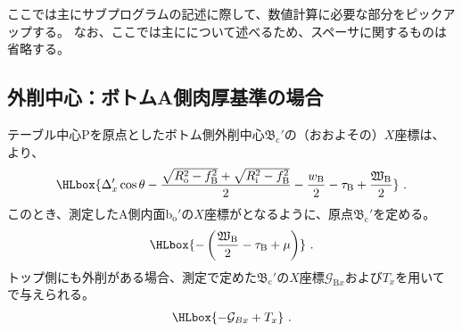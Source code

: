 

ここでは主にサブプログラムの記述に際して、数値計算に必要な部分をピックアップする。
なお、ここでは主に\DMC について述べるため、スペーサに関するものは省略する。





\subsection{外削中心：ボトムA側肉厚基準の場合}
テーブル中心Pを原点としたボトム側外削中心$\mathfrak B_\mathrm c'$の（おおよその）$X$座標は、より、
\begin{align*}
  \HLbox{%
    \Delta_x'\cos\theta
    -\frac{\sqrt{R_\mathrm o^2-f_\mathrm B^2}+\sqrt{R_\mathrm i^2-f_\mathrm B^2}}2
    -\frac{w_\mathrm B}2
    -\tau_\mathrm B
    +\frac{\mathfrak W_\mathrm B}2
  }\ .
\end{align*}
このとき、測定したA側内面b$_\mathrm o'$の$X$座標がとなるように、原点$\mathfrak B_\mathrm c'$を定める。
\begin{align*}
  \HLbox{-\left(\frac{\mathfrak W_\mathrm B}2-\tau_\mathrm B+\mu\right)}\ .
\end{align*}
トップ側にも外削がある場合、測定で定めた$\mathfrak B_\mathrm c'$の$X$座標$\mathcal G_{\mathrm Bx}$および\CenterlineEndFaceDifAC$T_x$を用いてで与えられる。
\begin{align*}
  \HLbox{-\mathcal G_{Bx}+T_x}\ .
\end{align*}


